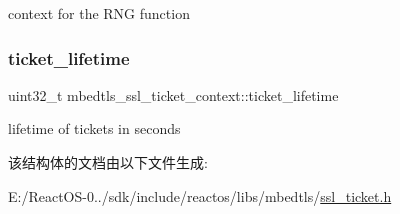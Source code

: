 context for the R\+NG function \mbox{\label{structmbedtls__ssl__ticket__context_ae2548112f1ab8d5ceb7752a205ce358c}} 
\subsubsection{\texorpdfstring{ticket\+\_\+lifetime}{ticket\_lifetime}}
{\footnotesize\ttfamily uint32\+\_\+t mbedtls\+\_\+ssl\+\_\+ticket\+\_\+context\+::ticket\+\_\+lifetime}

lifetime of tickets in seconds 

该结构体的文档由以下文件生成\+:\begin{DoxyCompactItemize}
\item 
E\+:/\+React\+O\+S-\/0../sdk/include/reactos/libs/mbedtls/\hyperlink{ssl__ticket_8h}{ssl\+\_\+ticket.\+h}\end{DoxyCompactItemize}
